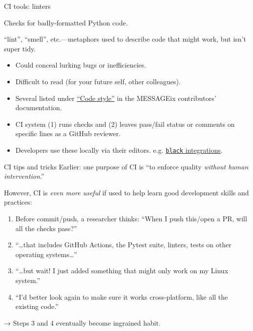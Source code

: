 \documentclass[12pt,aspectratio=169]{beamer}
\begin{document}
\begin{frame}{CI tools: linters}

  {\Large Checks for badly-formatted Python code.}

  \medskip
  “lint”, “smell”, etc.—metaphors used to describe code that might work, but isn't super tidy.
  \begin{itemize}
    \item Could conceal lurking bugs or inefficiencies.
    \item Difficult to read (for your future self, other colleagues).
  \end{itemize}

  \bigskip
  \begin{itemize}
    \item Several listed under \href{https://docs.messageix.org/en/stable/contributing.html\#code-style}{“Code style”} in the MESSAGEix contributors' documentation.
    \item CI system (1) runs checks and (2) leaves pass/fail status or comments on specific lines as a GitHub reviewer.
    \item Developers use these locally via their editors.
          e.g. \href{https://black.readthedocs.io/en/stable/integrations/editors.html}{\texttt{black} integrations}.
  \end{itemize}

\end{frame}

\begin{frame}{CI tips and tricks}
  Earlier: one purpose of CI is “to enforce quality \emph{without human intervention}.”

  \bigskip
  However, CI is \emph{even more useful} if used to help learn good development skills and practices:
  \begin{enumerate}
    \item Before commit/push, a researcher thinks: “When I push this/open a PR, will all the checks pass?”
    \item “…that includes GitHub Actions, the Pytest suite, linters, tests on other operating systems…”
    \item “…but wait! I just added something that might only work on my Linux system.”
    \item “I'd better look again to make sure it works cross-platform, like all the existing code.”
  \end{enumerate}

  \bigskip
  \hspace{2em} → Steps 3 and 4 eventually become ingrained habit.

\end{frame}
\end{document}
